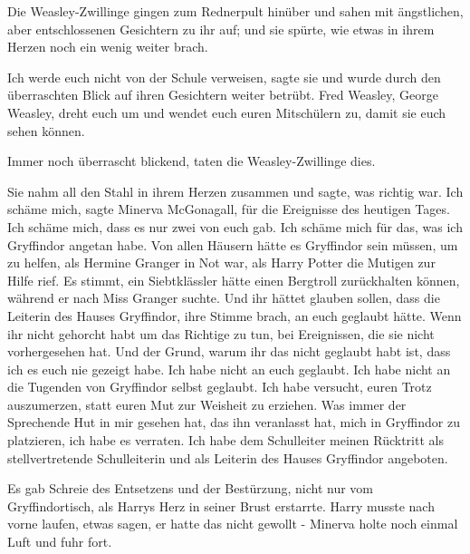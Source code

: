 Die Weasley-Zwillinge gingen zum Rednerpult hinüber und sahen mit ängstlichen,
aber entschlossenen Gesichtern zu ihr auf; und sie spürte, wie etwas in ihrem
Herzen noch ein wenig weiter brach.

\glqq{}Ich werde euch nicht von der Schule verweisen\grqq{}, sagte sie und wurde
durch den überraschten Blick auf ihren Gesichtern weiter betrübt. \glqq{}Fred
Weasley, George Weasley, dreht euch um und wendet euch euren Mitschülern zu,
damit sie euch sehen können.\grqq{}

Immer noch überrascht blickend, taten die Weasley-Zwillinge dies.

Sie nahm all den Stahl in ihrem Herzen zusammen und sagte, was richtig war.
\glqq{}Ich schäme mich\grqq{}, sagte Minerva McGonagall, \glqq{}für die Ereignisse
des heutigen Tages. Ich schäme mich, dass es nur zwei von euch gab. Ich schäme
mich für das, was ich Gryffindor angetan habe. Von allen Häusern hätte es
Gryffindor sein müssen, um zu helfen, als Hermine Granger in Not war, als Harry
Potter die Mutigen zur Hilfe rief. Es stimmt, ein Siebtklässler hätte einen
Bergtroll zurückhalten können, während er nach Miss Granger suchte. Und ihr
hättet glauben sollen, dass die Leiterin des Hauses Gryffindor\grqq{}, ihre
Stimme brach, \glqq{}an euch geglaubt hätte. Wenn ihr nicht gehorcht habt um das
Richtige zu tun, bei Ereignissen, die sie nicht vorhergesehen hat. Und der
Grund, warum ihr das nicht geglaubt habt ist, dass ich es euch nie gezeigt habe.
Ich habe nicht an euch geglaubt. Ich habe nicht an die Tugenden von Gryffindor
selbst geglaubt. Ich habe versucht, euren Trotz auszumerzen, statt euren Mut zur
Weisheit zu erziehen. Was immer der Sprechende Hut in mir gesehen hat, das ihn
veranlasst hat, mich in Gryffindor zu platzieren, ich habe es verraten. Ich habe
dem Schulleiter meinen Rücktritt als stellvertretende Schulleiterin und als
Leiterin des Hauses Gryffindor angeboten.\grqq{}

Es gab Schreie des Entsetzens und der Bestürzung, nicht nur vom Gryffindortisch,
als Harrys Herz in seiner Brust erstarrte. Harry musste nach vorne laufen, etwas
sagen, er hatte das nicht gewollt - Minerva holte noch einmal Luft und fuhr
fort.

